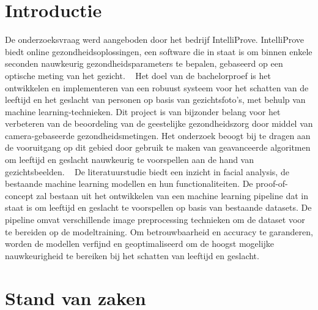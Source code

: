 
\section{Introductie}%
\label{sec:introductie}

De onderzoeksvraag werd aangeboden door het bedrijf IntelliProve. IntelliProve biedt online gezondheidsoplossingen, een software die in staat is om binnen enkele seconden nauwkeurig gezondheidsparameters te bepalen, gebaseerd op een optische meting van het gezicht.  
Het doel van de bachelorproef is het ontwikkelen en implementeren van een robuust systeem voor het schatten van de leeftijd en het geslacht van personen op basis van gezichtsfoto's, met behulp van machine learning-technieken. 
Dit project is van bijzonder belang voor het verbeteren van de beoordeling van de geestelijke gezondheidszorg door middel van camera-gebaseerde gezondheidsmetingen. Het onderzoek beoogt bij te dragen aan de vooruitgang op dit gebied door gebruik te maken van geavanceerde algoritmen om leeftijd en geslacht nauwkeurig te voorspellen aan de hand van gezichtsbeelden.  
De literatuurstudie biedt een inzicht in facial analysis, de bestaande machine learning modellen en hun functionaliteiten. De proof-of-concept zal bestaan uit het ontwikkelen van een machine learning pipeline dat in staat is om leeftijd en geslacht te voorspellen op basis van bestaande datasets. De pipeline omvat verschillende image preprocessing technieken om de dataset voor te bereiden op de modeltraining. Om betrouwbaarheid en accuracy te garanderen, worden de modellen verfijnd en geoptimaliseerd om de hoogst mogelijke nauwkeurigheid te bereiken bij het schatten van leeftijd en geslacht.

\section{Stand van zaken}
\label{sec:stand-van-zaken}

